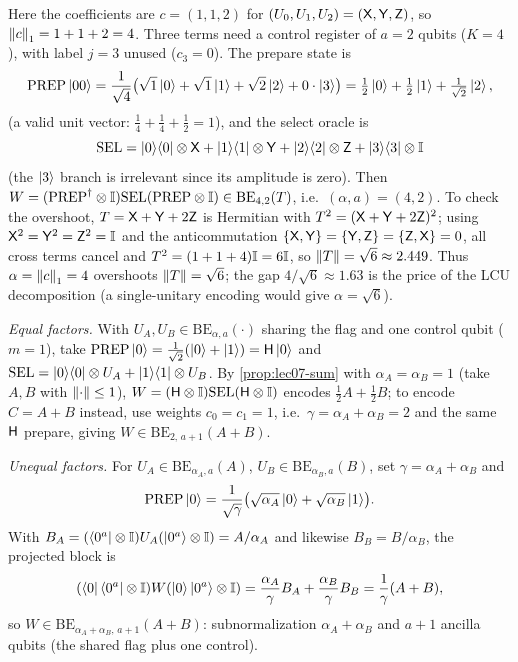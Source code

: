 \begin{solution}
Here the coefficients are $c=(1,1,2)$ for $(U_0,U_1,U_2)=(\mathsf{X},\mathsf{Y},\mathsf{Z})$, so
$\left\lVert c \right\rVert_1=1+1+2=4$. Three terms need a control register of $a=2$ qubits ($K=4$),
with label $j=3$ unused ($c_3=0$). The prepare state is
\[
  \mathrm{PREP}\ket{00}=\frac{1}{\sqrt4}\bigl(\sqrt1\ket{0}+\sqrt1\ket{1}
  +\sqrt2\ket{2}+0\cdot\ket{3}\bigr)
  =\tfrac12\ket{0}+\tfrac12\ket{1}+\tfrac{1}{\sqrt2}\ket{2},
\]
(a valid unit vector: $\tfrac14+\tfrac14+\tfrac12=1$), and the select oracle is
\[
  \mathrm{SEL}=\ket{0}\!\bra{0}\otimes\mathsf{X}+\ket{1}\!\bra{1}\otimes\mathsf{Y}
  +\ket{2}\!\bra{2}\otimes\mathsf{Z}+\ket{3}\!\bra{3}\otimes\mathbb{I}
\]
(the $\ket3$ branch is irrelevant since its amplitude is zero). Then
$W=(\mathrm{PREP}^{\dagger}\otimes\mathbb{I})\mathrm{SEL}(\mathrm{PREP}\otimes\mathbb{I})
\in\mathrm{BE}_{4,2}(T)$, i.e.\ $(\alpha,a)=(4,2)$. To check the overshoot, $T=\mathsf{X}
+\mathsf{Y}+2\mathsf{Z}$ is Hermitian with $T^2=(\mathsf{X}+\mathsf{Y}+2\mathsf{Z})^2$; using
$\mathsf{X}^2=\mathsf{Y}^2=\mathsf{Z}^2=\mathbb{I}$ and the anticommutation
$\{\mathsf{X},\mathsf{Y}\}=\{\mathsf{Y},\mathsf{Z}\}=\{\mathsf{Z},\mathsf{X}\}=0$, all cross terms cancel and
$T^2=(1+1+4)\mathbb{I}=6\mathbb{I}$, so $\left\lVert T \right\rVert=\sqrt6\approx2.449$. Thus $\alpha=\left\lVert c \right\rVert_1=4$
overshoots $\left\lVert T \right\rVert=\sqrt6$; the gap $4/\sqrt6\approx1.63$ is the price of the
LCU decomposition (a single-unitary encoding would give $\alpha=\sqrt6$).
\end{solution}

\begin{solution}
\emph{Equal factors.} With $U_A,U_B\in\mathrm{BE}_{\alpha,a}(\cdot)$ sharing the flag
and one control qubit ($m=1$), take $\mathrm{PREP}\ket0=\tfrac{1}{\sqrt2}(\ket0+
\ket1)=\mathsf{H}\ket0$ and $\mathrm{SEL}=\ket{0}\!\bra{0}\otimes U_A+\ket{1}\!\bra{1}\otimes U_B$. By
\cref{prop:lec07-sum} with $\alpha_A=\alpha_B=1$ (take $A,B$ with $\left\lVert \cdot \right\rVert\le1$),
$W=(\mathsf{H}\otimes\mathbb{I})\mathrm{SEL}(\mathsf{H}\otimes\mathbb{I})$ encodes
$\tfrac12 A+\tfrac12 B$; to encode $C=A+B$ instead, use weights $c_0=c_1=1$, i.e.\
$\gamma=\alpha_A+\alpha_B=2$ and the same $\mathsf{H}$ prepare, giving
$W\in\mathrm{BE}_{2,\,a+1}(A+B)$.

\emph{Unequal factors.} For $U_A\in\mathrm{BE}_{\alpha_A,a}(A)$,
$U_B\in\mathrm{BE}_{\alpha_B,a}(B)$, set $\gamma=\alpha_A+\alpha_B$ and
\[
  \mathrm{PREP}\ket0=\frac{1}{\sqrt{\gamma}}\bigl(\sqrt{\alpha_A}\ket0
  +\sqrt{\alpha_B}\ket1\bigr).
\]
With $B_A=(\bra{0^a}\otimes\mathbb{I})U_A(\ket{0^a}\otimes\mathbb{I})=A/\alpha_A$ and likewise
$B_B=B/\alpha_B$, the projected block is
\[
  (\bra0\bra{0^a}\otimes\mathbb{I})W(\ket0\ket{0^a}\otimes\mathbb{I})
  =\frac{\alpha_A}{\gamma}B_A+\frac{\alpha_B}{\gamma}B_B
  =\frac{1}{\gamma}(A+B),
\]
so $W\in\mathrm{BE}_{\alpha_A+\alpha_B,\,a+1}(A+B)$: subnormalization
$\alpha_A+\alpha_B$ and $a+1$ ancilla qubits (the shared flag plus one control).
\end{solution}

